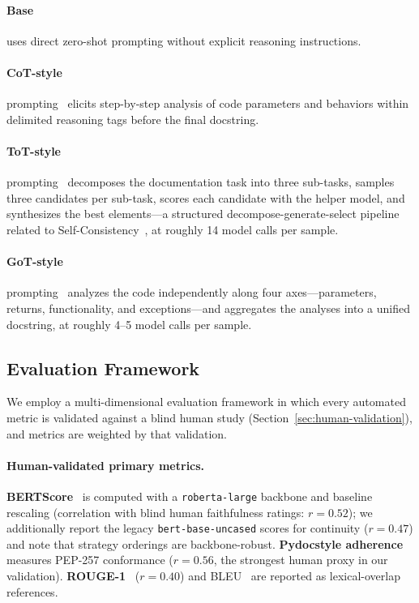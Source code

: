 \documentclass[pdflatex,sn-mathphys-ay]{sn-jnl}%
\theoremstyle{thmstyleone}%
\theoremstyle{thmstyletwo}%
\theoremstyle{thmstylethree}%
\begin{document}
\paragraph{Base} uses direct zero-shot prompting without explicit reasoning instructions.
\paragraph{CoT-style} prompting~\cite{cot} elicits step-by-step analysis of code parameters and behaviors within delimited reasoning tags before the final docstring.
\paragraph{ToT-style} prompting~\cite{tot} decomposes the documentation task into three sub-tasks, samples three candidates per sub-task, scores each candidate with the helper model, and synthesizes the best elements---a structured decompose-generate-select pipeline related to Self-Consistency~\cite{wang2023selfconsistency}, at roughly 14 model calls per sample.
\paragraph{GoT-style} prompting~\cite{got} analyzes the code independently along four axes---parameters, returns, functionality, and exceptions---and aggregates the analyses into a unified docstring, at roughly 4--5 model calls per sample.

\subsection{Evaluation Framework}
\label{sec:eval-design}
We employ a multi-dimensional evaluation framework in which every automated metric is validated against a blind human study (Section~\ref{sec:human-validation}), and metrics are weighted by that validation.
\paragraph{Human-validated primary metrics.} \textbf{BERTScore}~\cite{BERT} is computed with a \texttt{roberta-large} backbone and baseline rescaling (correlation with blind human faithfulness ratings: $r=0.52$); we additionally report the legacy \texttt{bert-base-uncased} scores for continuity ($r=0.47$) and note that strategy orderings are backbone-robust. \textbf{Pydocstyle adherence} measures PEP-257 conformance ($r=0.56$, the strongest human proxy in our validation). \textbf{ROUGE-1}~\cite{rouge} ($r=0.40$) and BLEU~\cite{BLEU} are reported as lexical-overlap references.
\end{document}
